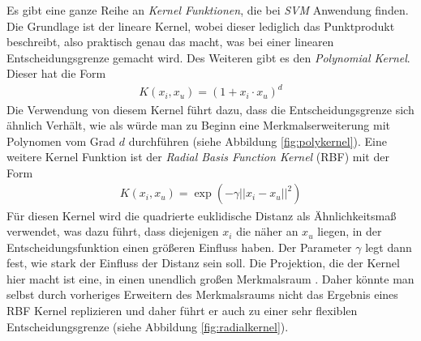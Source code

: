 \documentclass[
]{article}
\begin{document}
Es gibt eine ganze Reihe an \textit{Kernel Funktionen}, die bei
\textit{SVM} Anwendung finden. Die Grundlage ist der lineare Kernel,
wobei dieser lediglich das Punktprodukt beschreibt, also praktisch genau
das macht, was bei einer linearen Entscheidungsgrenze gemacht wird. Des
Weiteren gibt es den \textit{Polynomial Kernel}. Dieser hat die Form
\begin{align}
 K(x_i,x_u)=(1+x_i\cdot x_u)^d
\end{align} Die Verwendung von diesem Kernel führt dazu, dass die
Entscheidungsgrenze sich ähnlich Verhält, wie als würde man zu Beginn
eine Merkmalserweiterung mit Polynomen vom Grad \(d\) durchführen (siehe
Abbildung \ref{fig:polykernel}). Eine weitere Kernel Funktion ist der
\textit{Radial Basis Function Kernel} (RBF) mit der Form \begin{align}
K(x_i,x_u)=\exp\left(-\gamma ||x_i-x_u||^2\right)
\end{align} Für diesen Kernel wird die quadrierte euklidische Distanz
als Ähnlichkeitsmaß verwendet, was dazu führt, dass diejenigen \(x_i\)
die näher an \(x_u\) liegen, in der Entscheidungsfunktion einen größeren
Einfluss haben. Der Parameter \(\gamma\) legt dann fest, wie stark der
Einfluss der Distanz sein soll. Die Projektion, die der Kernel hier
macht ist eine, in einen unendlich großen Merkmalsraum
\parencite{jamesIntroductionStatisticalLearning2021}. Daher könnte man
selbst durch vorheriges Erweitern des Merkmalsraums nicht das Ergebnis
eines RBF Kernel replizieren und daher führt er auch zu einer sehr
flexiblen Entscheidungsgrenze (siehe Abbildung
\ref{fig:radialkernel}).\\
\end{document}
